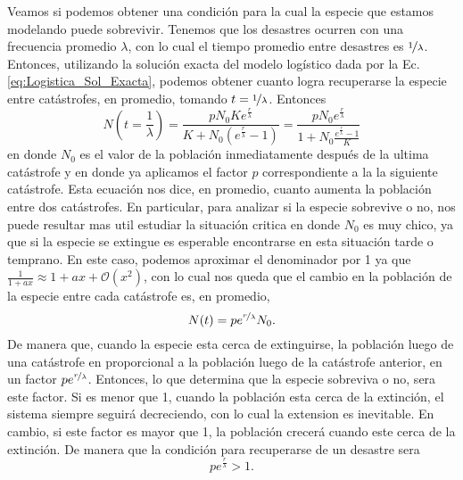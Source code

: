 Veamos si podemos obtener una condición para la cual la especie que estamos modelando puede sobrevivir. Tenemos que los desastres ocurren con una frecuencia promedio $\lambda$, con lo cual el tiempo promedio entre desastres es $\nicefrac{1}{\lambda}$. Entonces, utilizando la solución exacta del modelo logístico dada por la Ec. \ref{eq:Logistica_Sol_Exacta}, podemos obtener cuanto logra recuperarse la especie entre catástrofes, en promedio, tomando $t=\nicefrac{1}{\lambda}$. Entonces
\begin{equation}
    N(t=\frac{1}{\lambda}) = \frac{pN_{0} K e^{\frac{r}{\lambda}}}{K+N_{0}(e^{\frac{r}{\lambda}}-1)} = \frac{pN_{0} e^{\frac{r}{\lambda}}}{1+N_{0}\frac{e^{\frac{r}{\lambda}}-1}{K}} 
\end{equation}
en donde $N_{0}$ es el valor de la población inmediatamente después de la ultima catástrofe y en donde ya aplicamos el factor $p$ correspondiente a la la siguiente catástrofe. Esta ecuación nos dice, en promedio, cuanto aumenta la población entre dos catástrofes. En particular, para analizar si la especie sobrevive o no, nos puede resultar mas util estudiar la situación critica en donde $N_{0}$ es muy chico, ya que si la especie se extingue es esperable encontrarse en esta situación tarde o temprano. En este caso, podemos aproximar el denominador por 1 ya que $\frac{1}{1+ax} \approx 1 + ax + \mathcal{O}(x^2)$, con lo cual nos queda que el cambio en la población de la especie entre cada catástrofe es, en promedio,
\begin{equation}
    N(t) = pe^{\nicefrac{r}{\lambda}}N_{0}.
\end{equation}
De manera que, cuando la especie esta cerca de extinguirse, la población luego de una catástrofe en proporcional a la población luego de la catástrofe anterior, en un factor $pe^{\nicefrac{r}{\lambda}}$. Entonces, lo que determina que la especie sobreviva o no, sera este factor. Si es menor que 1, cuando la población esta cerca de la extinción, el sistema siempre seguirá decreciendo, con lo cual la extension es inevitable. En cambio, si este factor es mayor que 1, la población crecerá cuando este cerca de la extinción. De manera que la condición para recuperarse de un desastre sera
\begin{equation}
    pe^{\frac{r}{\lambda}} > 1.
\end{equation}

